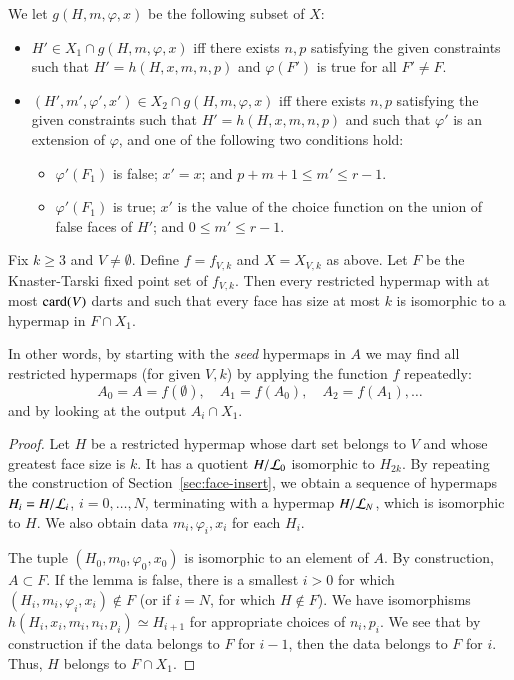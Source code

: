 We let $g(H,m,\varphi,x)$ be the following subset of $X$:
\begin{itemize}
\item $H'\in X_1\cap g(H,m,\varphi,x)$ iff there exists $n,p$ satisfying the given constraints such that $H'=h(H,x,m,n,p)$ and $\varphi(F')$ is true for all $F'\ne F$.
\item $(H',m',\varphi',x')\in X_2\cap g(H,m,\varphi,x)$ iff there exists $n,p$ satisfying the given constraints such that $H'=h(H,x,m,n,p)$ and such that $\varphi'$ is an extension of $\varphi$, and one of the following two conditions hold:
  \begin{itemize}
    \item $\varphi'(F_1)$ is false;  $x' = x$; and  $p+m+1 \le m' \le r-1$.
     \item $\varphi'(F_1)$ is true; $x'$ is the value of the choice function on the union of false faces of $H'$; and $0 \le m' \le r-1$.
  \end{itemize}
\end{itemize}



\begin{lemma}  Fix $k\ge 3$ and $V\ne \emptyset$.  
Define $f = f_{V,k}$ and $X = X_{V,k}$ as above.   Let $F$ be the Knaster-Tarski fixed point set of $f_{V,k}$.   Then every restricted hypermap with at most ${\operatorname{card}}(V)$ darts and such that every face has size at most $k$ is isomorphic to a hypermap in $F\cap X_1$.
\end{lemma}

In other words, by starting with the {\it seed} hypermaps in $A$ we may find all restricted hypermaps (for given $V,k$) by applying the function $f$ repeatedly:
$$
A_0 = A = f(\emptyset),\quad A_1 = f(A_0),\quad A_2 = f(A_1),\ldots
$$
and by looking at the output $A_i \cap X_1$.

\begin{proof}  Let $H$ be a restricted hypermap whose dart set belongs to $V$ and whose greatest face size is $k$.  It has a quotient $H/{\cal L}_0$ isomorphic to $H_{2k}$.  By repeating the construction of Section~\ref{sec:face-insert}, we obtain a sequence of hypermaps $H_i = H/{\cal L}_i$, $i=0,\ldots,N$, terminating with a hypermap $H/{\cal L}_N$, which is isomorphic to $H$.  We also obtain data $m_i,\varphi_i,x_i$ for each $H_i$.

The tuple $(H_0,m_0,\varphi_0,x_0)$ is isomorphic to an element of $A$.   By construction,
$A\subset F$.  If the lemma is false, there is a smallest $i>0$ for which $(H_i,m_i,\varphi_i,x_i)\not\in F$  (or if $i=N$, for which $H\not\in F$).   We have isomorphisms $h(H_i,x_i,m_i,n_i,p_i) \simeq H_{i+1}$ for appropriate choices of $n_i,p_i$.  We see that by construction if the data belongs to $F$ for $i-1$, then the data belongs to $F$ for $i$.  Thus, $H$ belongs to $F\cap X_1$.
\end{proof}

